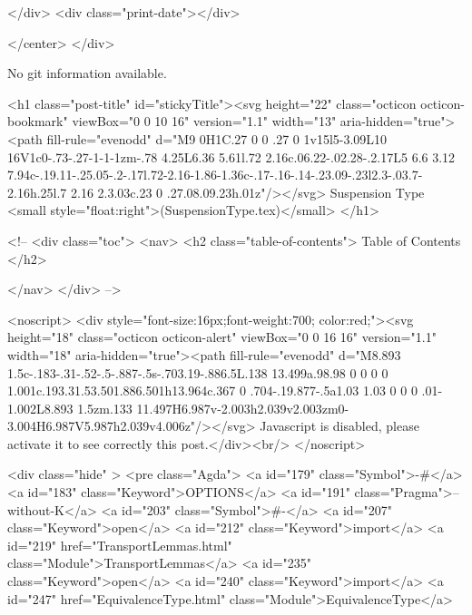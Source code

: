           
        </div>
        <div class="print-date"></div>
        
        
    </center>
  </div>

  
  No git information available.
  

  <h1 class="post-title" id="stickyTitle"><svg height="22" class="octicon octicon-bookmark" viewBox="0 0 10 16" version="1.1" width="13" aria-hidden="true"><path fill-rule="evenodd" d="M9 0H1C.27 0 0 .27 0 1v15l5-3.09L10 16V1c0-.73-.27-1-1-1zm-.78 4.25L6.36 5.61l.72 2.16c.06.22-.02.28-.2.17L5 6.6 3.12 7.94c-.19.11-.25.05-.2-.17l.72-2.16-1.86-1.36c-.17-.16-.14-.23.09-.23l2.3-.03.7-2.16h.25l.7 2.16 2.3.03c.23 0 .27.08.09.23h.01z"/></svg> Suspension Type <small style="float:right">(SuspensionType.tex)</small>
  </h1>

  <!-- 
  <div class="toc">
    <nav>
    <h2 class="table-of-contents"> Table of Contents </h2>
      

    </nav>
  </div>
   -->

  <noscript>
  <div style="font-size:16px;font-weight:700; color:red;"><svg height="18" class="octicon octicon-alert" viewBox="0 0 16 16" version="1.1" width="18" aria-hidden="true"><path fill-rule="evenodd" d="M8.893 1.5c-.183-.31-.52-.5-.887-.5s-.703.19-.886.5L.138 13.499a.98.98 0 0 0 0 1.001c.193.31.53.501.886.501h13.964c.367 0 .704-.19.877-.5a1.03 1.03 0 0 0 .01-1.002L8.893 1.5zm.133 11.497H6.987v-2.003h2.039v2.003zm0-3.004H6.987V5.987h2.039v4.006z"/></svg> Javascript is disabled, please activate it to see correctly this post.</div><br/>
  </noscript>

  <div class="hide" >
<pre class="Agda">
<a id="179" class="Symbol">{-#</a> <a id="183" class="Keyword">OPTIONS</a> <a id="191" class="Pragma">--without-K</a> <a id="203" class="Symbol">#-}</a>
<a id="207" class="Keyword">open</a> <a id="212" class="Keyword">import</a> <a id="219" href="TransportLemmas.html" class="Module">TransportLemmas</a>
<a id="235" class="Keyword">open</a> <a id="240" class="Keyword">import</a> <a id="247" href="EquivalenceType.html" class="Module">EquivalenceType</a>

